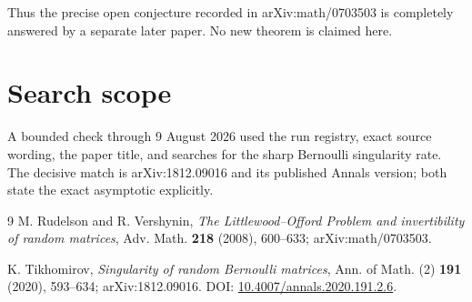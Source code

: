 \documentclass[11pt]{article}
\begin{document}
Thus the precise open conjecture recorded in arXiv:math/0703503 is completely
answered by a separate later paper.  No new theorem is claimed here.

\section{Search scope}

A bounded check through 9 August 2026 used the run registry, exact source
wording, the paper title, and searches for the sharp Bernoulli singularity
rate.  The decisive match is arXiv:1812.09016 and its published Annals
version; both state the exact asymptotic explicitly.

\begin{thebibliography}{9}
M. Rudelson and R. Vershynin,
\emph{The Littlewood--Offord Problem and invertibility of random matrices},
Adv. Math. \textbf{218} (2008), 600--633; arXiv:math/0703503.

K. Tikhomirov,
\emph{Singularity of random Bernoulli matrices},
Ann. of Math. (2) \textbf{191} (2020), 593--634;
arXiv:1812.09016. DOI: \href{https://doi.org/10.4007/annals.2020.191.2.6}{10.4007/annals.2020.191.2.6}.
\end{thebibliography}
\end{document}
